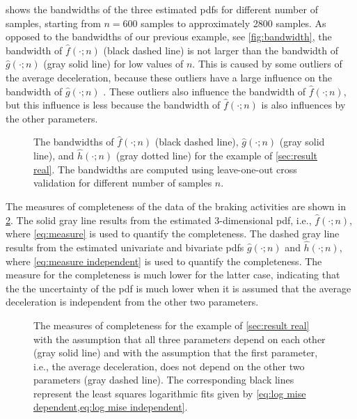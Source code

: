  shows the bandwidths of the three estimated pdfs for different number of samples, starting from $n=600$ samples to approximately 2800 samples. As opposed to the bandwidths of our previous example, see \cref{fig:bandwidth}, the bandwidth of $\hat{f}(\cdot;n)$ (black dashed line) is not larger than the bandwidth of $\hat{g}(\cdot;n)$ (gray solid line) for low values of $n$. This is caused by some outliers of the average deceleration, because these outliers have a large influence on the bandwidth of $\hat{g}(\cdot;n)$ \cite{hall1992global}. These outliers also influence the bandwidth of $\hat{f}(\cdot;n)$, but this influence is less because the bandwidth of $\hat{f}(\cdot;n)$ is also influences by the other parameters.

\setlength{}
\setlength{}
\begin{figure}
	\centering
	
	\caption{The bandwidths of $\hat{f}(\cdot;n)$ (black dashed line), $\hat{g}(\cdot;n)$ (gray solid line), and $\hat{h}(\cdot;n)$ (gray dotted line) for the example of \cref{sec:result real}. The bandwidths are computed using leave-one-out cross validation for different number of samples $n$.}
	\label{fig:bandwidth real}
\end{figure}

The measures of completeness of the data of the braking activities are shown in \cref{fig:mise real}. The solid gray line results from the estimated 3-dimensional pdf, i.e., $\hat{f}(\cdot;n)$, where \cref{eq:measure} is used to quantify the completeness. The dashed gray line results from the estimated univariate and bivariate pdfs $\hat{g}(\cdot;n)$ and $\hat{h}(\cdot;n)$, where \cref{eq:measure independent} is used to quantify the completeness. The measure for the completeness is much lower for the latter case, indicating that the the uncertainty of the pdf is much lower when it is assumed that the average deceleration is independent from the other two parameters.

\setlength\figurewidth{\linewidth}
\setlength\figureheight{\linewidth}
\begin{figure}
	\centering
	
	\caption{The measures of completeness for the example of \cref{sec:result real} with the assumption that all three parameters depend on each other (gray solid line) and with the assumption that the first parameter, i.e., the average deceleration, does not depend on the other two parameters (gray dashed line). The corresponding black lines represent the least squares logarithmic fits given by \cref{eq:log mise dependent,eq:log mise independent}.}
	\label{fig:mise real}
\end{figure}

